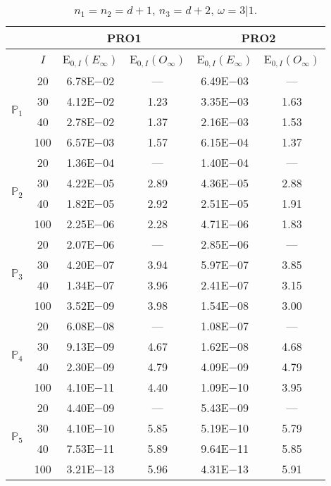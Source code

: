 \begin{table}[H]
\caption{$n_1=n_2=d+1$,  $n_3=d+2$, $\omega=3|1$.}
\setlength{\tabcolsep}{5pt}
\centering
\begin{tabular}{@{}l c c c c c@{}}
\toprule
 &  & \multicolumn{2}{c}{PRO1} & \multicolumn{2}{c}{PRO2}\\
\midrule
 & $I$ & E$_{0,I}(E_{\infty})$ & E$_{0,I}(O_{\infty})$ & E$_{0,I}(E_{\infty})$ & E$_{0,I}(O_{\infty})$\\
\midrule
\multirow{4}{*}{$\mathbb{P}_{1}$}
 & 20 & 6.78E$-$02 & --- & 6.49E$-$03 & ---\\
 & 30 & 4.12E$-$02 & 1.23 & 3.35E$-$03 & 1.63 \\
 & 40 & 2.78E$-$02 & 1.37 & 2.16E$-$03 & 1.53 \\
 & 100 & 6.57E$-$03 & 1.57 & 6.15E$-$04 & 1.37 \\
\midrule
\multirow{4}{*}{$\mathbb{P}_{2}$}
 & 20 & 1.36E$-$04 & --- & 1.40E$-$04 & ---\\
 & 30 & 4.22E$-$05 & 2.89 & 4.36E$-$05 & 2.88 \\
 & 40 & 1.82E$-$05 & 2.92 & 2.51E$-$05 & 1.91 \\
 & 100 & 2.25E$-$06 & 2.28 & 4.71E$-$06 & 1.83 \\
\midrule
\multirow{4}{*}{$\mathbb{P}_{3}$}
 & 20 & 2.07E$-$06 & --- & 2.85E$-$06 & ---\\
 & 30 & 4.20E$-$07 & 3.94 & 5.97E$-$07 & 3.85 \\
 & 40 & 1.34E$-$07 & 3.96 & 2.41E$-$07 & 3.15 \\
 & 100 & 3.52E$-$09 & 3.98 & 1.54E$-$08 & 3.00 \\
\midrule
\multirow{4}{*}{$\mathbb{P}_{4}$}
 & 20 & 6.08E$-$08 & --- & 1.08E$-$07 & ---\\
 & 30 & 9.13E$-$09 & 4.67 & 1.62E$-$08 & 4.68 \\
 & 40 & 2.30E$-$09 & 4.79 & 4.09E$-$09 & 4.79 \\
 & 100 & 4.10E$-$11 & 4.40 & 1.09E$-$10 & 3.95 \\
\midrule
\multirow{4}{*}{$\mathbb{P}_{5}$}
 & 20 & 4.40E$-$09 & --- & 5.43E$-$09 & ---\\
 & 30 & 4.10E$-$10 & 5.85 & 5.19E$-$10 & 5.79 \\
 & 40 & 7.53E$-$11 & 5.89 & 9.64E$-$11 & 5.85 \\
 & 100 & 3.21E$-$13 & 5.96 & 4.31E$-$13 & 5.91 \\
\bottomrule
\end{tabular}
\label{Table:PRO:Rodrigo:Test12}
\end{table}
